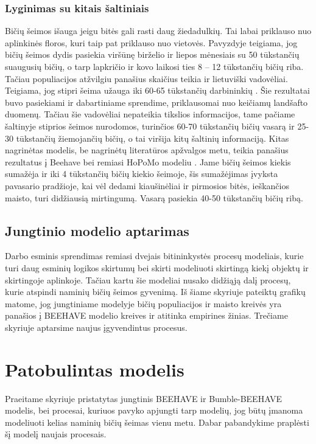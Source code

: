 \documentclass{VUMIFKompMagistrinis}
\begin{document}
\subsubsection{Lyginimas su kitais šaltiniais}
Bičių šeimos išauga jeigu bitės gali rasti daug žiedadulkių. Tai labai priklauso nuo aplinkinės floros, kuri taip pat priklauso nuo vietovės. Pavyzdyje \cite{Oli15} teigiama, jog bičių šeimos dydis pasiekia viršūnę birželio ir liepos mėnesiais su 50 tūkstančių suaugusių bičių, o tarp lapkričio ir kovo laikosi ties 8 – 12 tūkstančių bičių riba. Tačiau populiacijos atžvilgiu panašius skaičius teikia ir lietuviški vadovėliai. Teigiama, jog stipri šeima užauga iki 60-65 tūkstančių darbininkių \cite{Kar00}. Šie rezultatai buvo pasiekiami ir dabartiniame sprendime, priklausomai nuo keičiamų landšafto duomenų. Tačiau šie vadovėliai nepateikia tikslios informacijos, tame pačiame šaltinyje stiprios šeimos nurodomos, turinčios 60-70 tūkstančių bičių vasarą ir 25-30 tūkstančių žiemojančių bičių, o tai viršija kitų šaltinių informaciją. 
Kitas nagrinėtas modelis, be nagrinėtų literatūros apžvalgos metu, teikia panašius rezultatus į Beehave bei remiasi HoPoMo modeliu \cite{ScC07,BWZ16}. Jame bičių šeimos kiekis sumažėja ir iki 4 tūkstančių bičių kiekio šeimoje, šis sumažėjimas įvyksta pavasario pradžioje, kai vėl dedami kiaušinėliai ir pirmosios bitės, ieškančios maisto, turi didžiausią mirtingumą. Vasarą pasiekia 40-50 tūkstančių bičių ribą.
\subsection{Jungtinio modelio aptarimas}
Darbo esminis sprendimas remiasi dvejais bitininkystės procesų modeliais, kurie turi daug esminių logikos skirtumų bei skirti modeliuoti skirtingą kiekį objektų ir skirtingoje aplinkoje. Tačiau kartu šie modeliai nusako didžiąją dalį procesų, kurie atspindi naminių bičių šeimos gyvenimą. Iš šiame skyriuje pateiktų grafikų matome, jog jungtiniame modelyje bičių populiacijos ir maisto kreivės yra panašios į BEEHAVE modelio kreives ir atitinka empirines žinias. Trečiame skyriuje aptarsime naujus įgyvendintus procesus.

\section{Patobulintas modelis}

Praeitame skyriuje pristatytas jungtinis BEEHAVE ir Bumble-BEEHAVE modelis, bei procesai, kuriuos pavyko apjungti tarp modelių, jog būtų įmanoma modeliuoti kelias naminių bičių šeimas vienu metu. Dabar pabandykime praplėsti šį modelį naujais procesais. %
\end{document}
